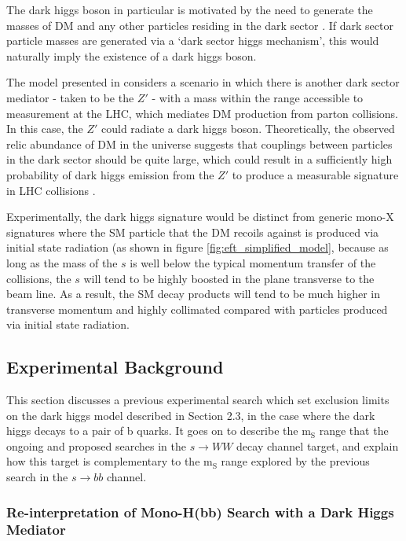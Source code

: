 \documentclass[12pt]{article}
\begin{document}
The dark higgs boson in particular is motivated by the need to generate the masses of DM and any other particles residing in the dark sector \cite{dark_higgs}. If dark sector particle masses are generated via a `dark sector higgs mechanism', this would naturally imply the existence of a dark higgs boson. 

The model presented in \cite{dark_higgs} considers a scenario in which there is another dark sector mediator - taken to be the $Z'$ - with a mass within the range accessible to measurement at the LHC, which mediates DM production from parton collisions. In this case, the $Z'$ could radiate a dark higgs boson. Theoretically, the observed relic abundance of DM in the universe suggests that couplings between particles in the dark sector should be quite large, which could result in a sufficiently high probability of dark higgs emission from the $Z'$ to produce a measurable signature in LHC collisions \cite{dark_higgs}. 

Experimentally, the dark higgs signature would be distinct from generic mono-X signatures where the SM particle that the DM recoils against is produced via initial state radiation (as shown in figure \ref{fig:eft_simplified_model}, because as long as the mass of the $s$ is well below the typical momentum transfer of the collisions, the $s$ will tend to be highly boosted in the plane transverse to the beam line. As a result, the SM decay products will tend to be much higher in transverse momentum and highly collimated compared with particles produced via initial state radiation.  

\subsection{Experimental Background}

This section discusses a previous experimental search which set exclusion limits on the dark higgs model described in Section 2.3, in the case where the dark higgs decays to a pair of b quarks. It goes on to describe the m$_\text{S}$ range that the ongoing and proposed searches in the $s \rightarrow WW$ decay channel target, and explain how this target is complementary to the m$_\text{S}$ range explored by the previous search in the $s \rightarrow bb$ channel. 

\subsubsection{Re-interpretation of Mono-H(bb) Search with a Dark Higgs Mediator}
\end{document}
